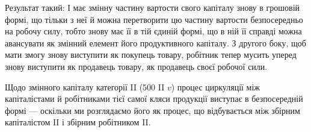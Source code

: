 Результат такий: І має змінну частину вартости свого капіталу знову
в грошовій формі, що тільки з неї й можна перетворити цю частину
вартости безпосередньо на робочу силу, тобто знову має її в тій єдиній
формі, що в ній її справді можна авансувати як змінний елемент його
продуктивного капіталу. З другого боку, щоб мати змогу знову виступити
як покупець товару, робітник тепер мусить уперед знову виступити
як продавець товару, як продавець своєї робочої сили.

Щодо змінного капіталу категорії II (500 II $v$) процес циркуляції
між капіталістами й робітниками тієї самої кляси продукції виступає в
безпосередній формі — оскільки ми розглядаємо його як процес, що відбувається
між збірним капіталістом II і збірним робітником II.
